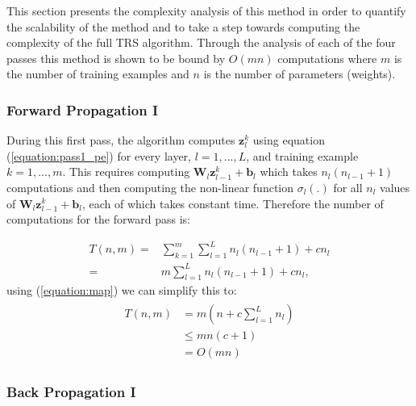 \documentclass[letterpaper,12pt,titlepage,oneside,final]{book}
\begin{document}
	This section presents the complexity analysis of this method in order to quantify the scalability of the method and to take a step towards computing the complexity of the full TRS algorithm. Through the analysis of each of the four passes this method is shown to be bound by $O(mn)$ computations where $m$ is the number of training examples and $n$ is the number of parameters (weights). 
	
	\subsubsection{Forward Propagation I}
	
	During this first pass, the algorithm computes $\mathbf{z}_{l}^{k}$ using equation (\ref{equation:pass1_pe}) for every layer, $l=1,...,L$, and training example $k=1,...,m$. This requires computing $\mathbf{W}_{l}\mathbf{z}^{k}_{l-1} + \mathbf{b}_{l}$ which takes $n_{l}(n_{l-1} + 1)$ computations and then computing the non-linear function $\sigma_{l}(.)$ for all $n_{l}$ values of $\mathbf{W}_{l}\mathbf{z}^{k}_{l-1} + \mathbf{b}_{l}$, each of which takes constant time. Therefore the number of computations for the forward pass is:
	
	\begin{equation}
	\begin{split}
	T(n,m) = & \sum_{k=1}^{m}{\sum_{l=1}^{L}{n_{l}(n_{l-1} + 1) + cn_{l}}} \\
	= & m\sum_{l=1}^{L}{n_{l}(n_{l-1}+1) + cn_{l}},
	\end{split}
	\end{equation}
	using (\ref{equation:map}) we can simplify this to:
	\begin{align}
	\begin{split}
	T(n,m) & = m(n + c\sum_{l=1}^{L}{n_{l}}) \\
	& \leq mn(c + 1) \\
	& = O(mn)
	\end{split}
	\end{align}
	
	
	
	\subsubsection{Back Propagation I}
	
\end{document}
